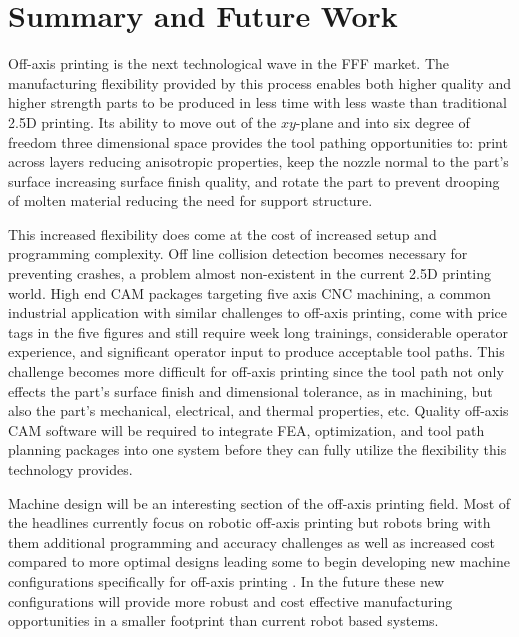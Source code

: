 \documentclass[main.tex]{subfiles}
\begin{document}
\chapter{Summary and Future Work}
Off-axis printing is the next technological wave in the FFF market.
The manufacturing flexibility provided by this process enables both higher quality and higher strength parts to be produced in less time with less waste than traditional 2.5D printing.
Its ability to move out of the $xy$\nobreakdash-plane and into six degree of freedom three dimensional space provides the tool pathing opportunities to: print across layers reducing anisotropic properties, keep the nozzle normal to the part's surface increasing surface finish quality, and rotate the part to prevent drooping of molten material reducing the need for support structure.

This increased flexibility does come at the cost of increased setup and programming complexity.
Off line collision detection becomes necessary for preventing crashes, a problem almost non-existent in the current 2.5D printing world.
High end CAM packages targeting five axis CNC machining, a common industrial application with similar challenges to off-axis printing, come with price tags in the five figures and still require week long trainings, considerable operator experience, and significant operator input to produce acceptable tool paths.
This challenge becomes more difficult for off-axis printing since the tool path not only effects the part's surface finish and dimensional tolerance, as in machining, but also the part's mechanical, electrical, and thermal properties, etc.
Quality off-axis CAM software will be required to integrate FEA, optimization, and tool path planning packages into one system before they can fully utilize the flexibility this technology provides.

Machine design will be an interesting section of the off-axis printing field.
Most of the headlines currently focus on robotic off-axis printing \cite{Hedges2014, Arevo2015, Vurpillat2016} but robots bring with them additional programming and accuracy challenges as well as increased cost compared to more optimal designs leading some to begin developing new machine configurations specifically for off-axis printing \cite{Song2015, Yerazunis2016}.
In the future these new configurations will provide more robust and cost effective manufacturing opportunities in a smaller footprint than current robot based systems.
\end{document}
